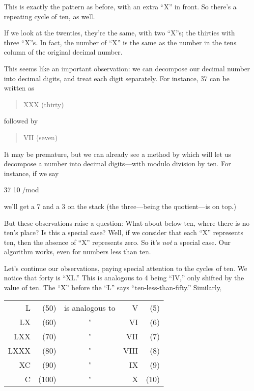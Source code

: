 \medskip
\noindent This is exactly the pattern as before, with an extra ``X''
in front. So there's a repeating cycle of ten, as well.

If we look at the twenties, they're the same, with two ``X''s; the
thirties with three ``X''s. In fact, the number of ``X'' is the same as the
number in the tens column of the original decimal number.

This seems like an important observation: we can decompose our decimal
number into decimal digits, and treat each digit separately. For instance,
37 can be written as

\begin{quote}
{\sf XXX (thirty)}
\end{quote}

\noindent followed by

\begin{quote}
{\sf VII (seven)}
\end{quote}

\noindent It may be premature, but we can already see a method by
which \Forth{} will let us decompose a number into decimal digits---with
modulo division by ten. For instance, if we say

\begin{Code}
37 10 /mod
\end{Code}
we'll get a 7 and a 3 on the stack (the three---being the quotient---is on
top.)

But these observations raise a question: What about below ten, where there
is no ten's place? Is this a special case? Well, if we consider that
each ``X'' represents ten, then the absence of ``X'' represents zero.  So
it's \emph{not} a special case. Our algorithm works, even for numbers less
than ten.

Let's continue our observations, paying special attention to the
cycles of ten. We notice that forty is ``XL.'' This is analogous to 4 being
``IV,'' only shifted by the value of ten. The ``X'' before the ``L'' says
``ten-less-than-fifty.'' Similarly,

\bigskip
{\sf\begin{tabular}{rrcrr}
   L &  (50) &   is analogous to &     V & (5) \\
  LX &  (60) &          "        &    VI & (6) \\
 LXX &  (70) &          "        &   VII & (7) \\
LXXX &  (80) &          "        &  VIII & (8) \\
  XC &  (90) &          "        &    IX & (9) \\
   C & (100) &          "        &     X & (10) \\
\end{tabular}}
\bigskip

